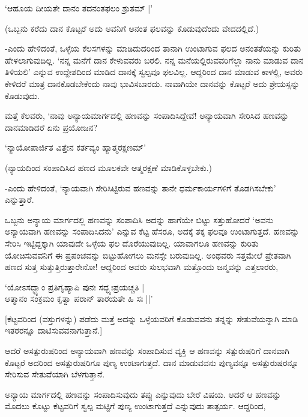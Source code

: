 \begin{shloka}
`ಆಹೂಯ ದೀಯತೇ ದಾನಂ ತದನಂತಫಲಂ ಶ್ರುತಮ್ |'
\end{shloka}

(ಒಬ್ಬನು ಕರೆದು ದಾನ ಕೊಟ್ಟರೆ ಅದು ಅವನಿಗೆ ಅನಂತ ಫಲವನ್ನು ಕೊಡುವುದೆಂದು ವೇದದಲ್ಲಿದೆ.)

-ಎಂದು ಹೇಳಿದಂತೆ, ಒಳ್ಳೆಯ ಕೆಲಸಗಳನ್ನು ಮಾಡಿದುದರಿಂದ ತಾನಾಗಿ ಉಂಟಾಗುವ ಫಲದ ಅನಂತತೆಯನ್ನು ಕುರಿತು ಹೇಳಲಾಗುವುದಿಲ್ಲ. `ನನ್ನ ಮನೆಗೆ ದಾನ ಕೇಳುವವರು ಬರಲಿ. ನನ್ನ ಮನೆಯಲ್ಲಿರುವವರಿಗೆಲ್ಲಾ ನಾನು ಮಾಡುವ ದಾನ ತಿಳಿಯಲಿ' ಎನ್ನುವ ಉದ್ದೇಶದಿಂದ ಮಾಡಿದ ದಾನಕ್ಕೆ ಸ್ವಲ್ಪವೂ ಫಲವಿಲ್ಲ. ಆದ್ದರಿಂದ ದಾನ ಮಾಡುವ ಕಾಳಲ್ಲಿ, ಅವರು ಕೇಳಿದರೆ ಮಾತ್ರ ದಾನಕೊಡಬೇಕೆಂದು ನಾವು ಭಾವಿಸಬಾರದು. ನಾವಾಗಿಯೇ ದಾನವನ್ನು ಕೊಟ್ಟರೆ ಅದು ಶ್ರೇಯಸ್ಸನ್ನು ಕೊಡುವುದು.

ಮತ್ತೆ ಕೆಲವರು, `ನಾವು ಅನ್ಯಾಯಮಾರ್ಗದಲ್ಲಿ ಹಣವನ್ನು ಸಂಪಾದಿಸಿದ್ದೇವೆ! ಅನ್ಯಾಯವಾಗಿ ಸೇರಿಸಿದ ಹಣವನ್ನು ದಾನಮಾಡಿದರೆ ಏನು ಪ್ರಯೋಜನ?

\begin{shloka}
`ನ್ಯಾಯೋಪಾರ್ಜಿತ ವಿತ್ತೇನ ಕರ್ತವ್ಯಂ ಹ್ಯಾತ್ಮರಕ್ಷಣಮ್'
\end{shloka}

(ನ್ಯಾಯದಿಂದ ಸಂಪಾದಿಸಿದ ಹಣದ ಮೂಲಕವೇ ಆತ್ಮರಕ್ಷಣೆ ಮಾಡಿಕೊಳ್ಳಬೇಕು.)

-ಎಂದು ಹೇಳಿದಂತೆ, `ನ್ಯಾಯವಾಗಿ ಸೇರಿಸಿಟ್ಟಿರುವ ಹಣವನ್ನು ತಾನೇ ಧರ್ಮಕಾರ್ಯಗಳಿಗೆ ತೊಡಗಿಸಬೇಕು' ಎನ್ನುತ್ತಾರೆ.

ಒಬ್ಬನು ಅನ್ಯಾಯ ಮಾರ್ಗದಲ್ಲಿ ಹಣವನ್ನು ಸಂಪಾದಿಸಿ ಅದನ್ನು ಹಾಗೆಯೇ ಬಿಟ್ಟು ಸತ್ತುಹೋದರೆ `ಅವನು ಅನ್ಯಾಯವಾಗಿ ಹಣವನ್ನು ಸಂಪಾದಿಸಿದನು' ಎನ್ನುವ ಕೆಟ್ಟ ಹೆಸರೂ, ಅದಕ್ಕೆ ತಕ್ಕ ಫಲವೂ ಉಂಟಾಗುತ್ತದೆ. ಹಣವನ್ನು ಸೇರಿಸಿ ಇಟ್ಟಿದ್ದಕ್ಕಾಗಿ ಯಾವುದೇ ಒಳ್ಳೆಯ ಫಲ ದೊರೆಯುವುದಿಲ್ಲ. ಯಾವಾಗಲೂ ಹಣವನ್ನು ಕುರಿತು ಯೋಚಿಸುವವನಿಗೆ ಈ ಪ್ರಪಂಚವನ್ನು ಬಿಟ್ಟುಹೋಗಲು ಮನಸ್ಸೇ ಬರುವುದಿಲ್ಲ. ಅಂಥವರು ಸತ್ತಮೇಲೆ ಪ್ರೇತವಾಗಿ ಹಣದ ಸುತ್ತ ಸುತ್ತುತ್ತಿರುತ್ತಾರೇನೋ! ಆದ್ದರಿಂದ ಅವರು ಸುಲಭವಾಗಿ ಮತ್ತೊಂದು ಜನ್ಮವನ್ನು ಎತ್ತಲಾರರು,

\begin{shloka}
`ಯೋಽಸದ್ಭ್ಯಾಂ ಪ್ರತಿಗೃಹ್ಯಾಪಿ ಪುನಃ ಸದ್ಭ್ಯಃಪ್ರಯಚ್ಚತಿ |\\
ಆತ್ಮಾನಂ ಸಂಕ್ರಮಂ ಕೃತ್ವಾ ಪರಾನ್ ತಾರಯತೇ ಹಿ ಸಃ ||'
\end{shloka}

[ಕೆಟ್ಟವರಿಂದ (ವಸ್ತುಗಳನ್ನು) ಪಡೆದು ಮತ್ತೆ ಅದನ್ನು ಒಳ್ಳೆಯವರಿಗೆ ಕೊಡುವವನು ತನ್ನನ್ನು ಸೇತುವೆಯನ್ನಾಗಿ ಮಾಡಿ ಇತರರನ್ನೂ ದಾಟಿಸುವವನಾಗುತ್ತಾನೆ.]

ಆದರೆ ಅಸತ್ಪುರುಷರಿಂದ ಅನ್ಯಾಯವಾಗಿ ಹಣವನ್ನು ಸಂಪಾದಿಸುವ ವ್ಯಕ್ತಿ ಆ ಹಣವನ್ನು ಸತ್ಪುರುಷರಿಗೆ ದಾನವಾಗಿ ಕೊಟ್ಟರೆ ಅದರಿಂದ ಅಸತ್ಪುರುಷರಿಗೂ ಪುಣ್ಯ ಉಂಟಾಗುತ್ತದೆ. ದಾನ ಮಾಡುವವನು ಪುಣ್ಯವನ್ನೂ ಅಸತ್ಪುರುಷರನ್ನೂ ಸೇರಿಸುವ ಸೇತುವೆಯಾಗಿ ಬೆಳಗುತ್ತಾನೆ.

ಅನ್ಯಾಯ ಮಾರ್ಗದಲ್ಲಿ ಹಣವನ್ನು ಸಂಪಾದಿಸುವುದು ತಪ್ಪು ಎನ್ನುವುದು ಬೇರೆ ವಿಷಯ. ಆದರೆ ಆ ಹಣವನ್ನು ಮೊದಲು ಕೊಟ್ಟು ಕೆಟ್ಟವರಿಗೆ ಸ್ವಲ್ಪ ಮಟ್ಟಿಗೆ ಪುಣ್ಯ ಉಂಟಾಗುತ್ತದೆ ಎನ್ನುವುದು ತಾತ್ಪರ್ಯ. ಆದ್ದರಿಂದ,

